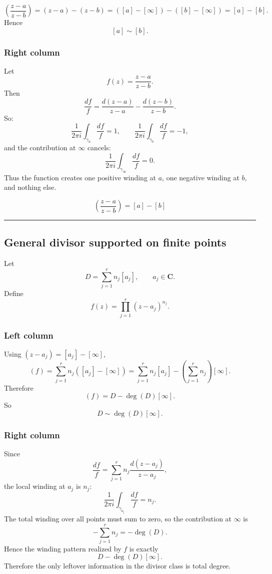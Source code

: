 \documentclass[11pt]{article}
\begin{document}
	\[
	\left(\frac{z-a}{z-b}\right)=(z-a)-(z-b)=([a]-[\infty])-([b]-[\infty])=[a]-[b].
	\]
	Hence
	\[
	[a]\sim [b].
	\]
	
	\subsubsection*{Right column}
	
	Let
	\[
	f(z)=\frac{z-a}{z-b}.
	\]
	Then
	\[
	\frac{df}{f}
	=
	\frac{d(z-a)}{z-a}-\frac{d(z-b)}{z-b}.
	\]
	So:
	\[
	\frac{1}{2\pi i}\int_{\gamma_a}\frac{df}{f}=1,\qquad
	\frac{1}{2\pi i}\int_{\gamma_b}\frac{df}{f}=-1,
	\]
	and the contribution at \(\infty\) cancels:
	\[
	\frac{1}{2\pi i}\int_{\gamma_\infty}\frac{df}{f}=0.
	\]
	Thus the function creates one positive winding at \(a\), one negative winding at \(b\), and nothing else.
	
	\bigskip
	
	\[
	\boxed{\left(\frac{z-a}{z-b}\right)=[a]-[b]}
	\]
	
	\bigskip
	\hrule
	\bigskip
	
	\subsection*{General divisor supported on finite points}
	
	Let
	\[
	D=\sum_{j=1}^r n_j[a_j],
	\qquad a_j\in\mathbf{C}.
	\]
	Define
	\[
	f(z)=\prod_{j=1}^r (z-a_j)^{n_j}.
	\]
	
	\subsubsection*{Left column}
	
	Using \((z-a_j)=[a_j]-[\infty]\),
	\[
	(f)=\sum_{j=1}^r n_j([a_j]-[\infty])
	=\sum_{j=1}^r n_j[a_j]-\left(\sum_{j=1}^r n_j\right)[\infty].
	\]
	Therefore
	\[
	(f)=D-\deg(D)[\infty].
	\]
	So
	\[
	D\sim \deg(D)[\infty].
	\]
	
	\subsubsection*{Right column}
	
	Since
	\[
	\frac{df}{f}
	=
	\sum_{j=1}^r n_j\frac{d(z-a_j)}{z-a_j},
	\]
	the local winding at \(a_j\) is \(n_j\):
	\[
	\frac{1}{2\pi i}\int_{\gamma_{a_j}}\frac{df}{f}=n_j.
	\]
	The total winding over all points must sum to zero, so the contribution at \(\infty\) is
	\[
	-\sum_{j=1}^r n_j=-\deg(D).
	\]
	Hence the winding pattern realized by \(f\) is exactly
	\[
	D-\deg(D)[\infty].
	\]
	Therefore the only leftover information in the divisor class is total degree.
	
\end{document}
